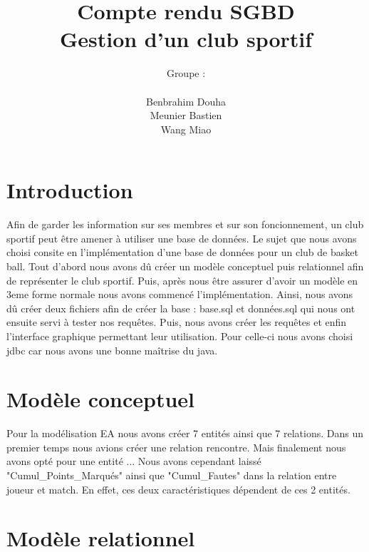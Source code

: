 \documentclass{article}
\author{Groupe :\\ \\Benbrahim Douha\\Meunier Bastien\\Wang Miao }
\title{Compte rendu SGBD \\ Gestion d'un club sportif}
\begin{document}
\maketitle
\newpage
\section{Introduction}

Afin de garder les information sur ses membres et sur son foncionnement, un club sportif peut être amener à utiliser une base de données. Le sujet que nous avons choisi consite en l'implémentation d'une base de données pour un club de basket ball.
Tout d'abord nous avons dû créer un modèle conceptuel puis relationnel afin de représenter le club sportif. Puis, après nous être assurer d'avoir un modèle en 3eme forme normale nous avons commencé l'implémentation. 
Ainsi, nous avons dû créer deux fichiers afin de créer la base : base.sql et données.sql qui nous ont ensuite servi à tester nos requêtes.
Puis, nous avons créer les requêtes et enfin l'interface graphique permettant leur utilisation. Pour celle-ci nous avons choisi jdbc car nous avons une bonne maîtrise du java.


\section{Modèle conceptuel}

Pour la modélisation EA nous avons créer 7 entités ainsi que 7 relations. Dans un premier temps nous avions créer une relation rencontre. Mais finalement nous avons opté pour une entité ... %
Nous avons cependant laissé "Cumul_Points_Marqués" ainsi que "Cumul_Fautes" dans la relation entre joueur et match. En effet, ces deux caractéristiques dépendent de ces 2 entités.


 


\section{Modèle relationnel}





\subsection*{}


\section*{}
\subsection*{}


\subsection*{}
\end{document}
